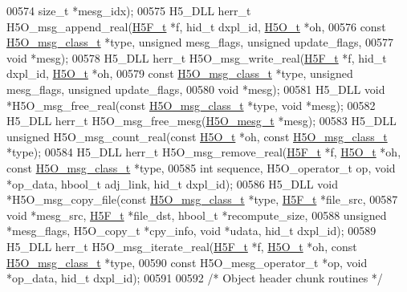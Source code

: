 \begin{DoxyCode}
00574     \textcolor{keywordtype}{size\_t} *mesg\_idx);
00575 H5\_DLL herr\_t H5O\_msg\_append\_real(\hyperlink{struct_h5_f__t}{H5F\_t} *f, hid\_t dxpl\_id, \hyperlink{struct_h5_o__t}{H5O\_t} *oh,
00576     \textcolor{keyword}{const} \hyperlink{struct_h5_o__msg__class__t}{H5O\_msg\_class\_t} *type, \textcolor{keywordtype}{unsigned} mesg\_flags, \textcolor{keywordtype}{unsigned} update\_flags,
00577     \textcolor{keywordtype}{void} *mesg);
00578 H5\_DLL herr\_t H5O\_msg\_write\_real(\hyperlink{struct_h5_f__t}{H5F\_t} *f, hid\_t dxpl\_id, \hyperlink{struct_h5_o__t}{H5O\_t} *oh,
00579     \textcolor{keyword}{const} \hyperlink{struct_h5_o__msg__class__t}{H5O\_msg\_class\_t} *type, \textcolor{keywordtype}{unsigned} mesg\_flags, \textcolor{keywordtype}{unsigned} update\_flags,
00580     \textcolor{keywordtype}{void} *mesg);
00581 H5\_DLL \textcolor{keywordtype}{void} *H5O\_msg\_free\_real(\textcolor{keyword}{const} \hyperlink{struct_h5_o__msg__class__t}{H5O\_msg\_class\_t} *type, \textcolor{keywordtype}{void} *mesg);
00582 H5\_DLL herr\_t H5O\_msg\_free\_mesg(\hyperlink{struct_h5_o__mesg__t}{H5O\_mesg\_t} *mesg);
00583 H5\_DLL \textcolor{keywordtype}{unsigned} H5O\_msg\_count\_real(\textcolor{keyword}{const} \hyperlink{struct_h5_o__t}{H5O\_t} *oh, \textcolor{keyword}{const} \hyperlink{struct_h5_o__msg__class__t}{H5O\_msg\_class\_t} *type);
00584 H5\_DLL herr\_t H5O\_msg\_remove\_real(\hyperlink{struct_h5_f__t}{H5F\_t} *f, \hyperlink{struct_h5_o__t}{H5O\_t} *oh, \textcolor{keyword}{const} 
      \hyperlink{struct_h5_o__msg__class__t}{H5O\_msg\_class\_t} *type,
00585     \textcolor{keywordtype}{int} sequence, H5O\_operator\_t op, \textcolor{keywordtype}{void} *op\_data, hbool\_t adj\_link, hid\_t dxpl\_id);
00586 H5\_DLL \textcolor{keywordtype}{void} *H5O\_msg\_copy\_file(\textcolor{keyword}{const} \hyperlink{struct_h5_o__msg__class__t}{H5O\_msg\_class\_t} *type, \hyperlink{struct_h5_f__t}{H5F\_t} *file\_src,
00587     \textcolor{keywordtype}{void} *mesg\_src, \hyperlink{struct_h5_f__t}{H5F\_t} *file\_dst, hbool\_t *recompute\_size,
00588     \textcolor{keywordtype}{unsigned} *mesg\_flags, H5O\_copy\_t *cpy\_info, \textcolor{keywordtype}{void} *udata, hid\_t dxpl\_id);
00589 H5\_DLL herr\_t H5O\_msg\_iterate\_real(\hyperlink{struct_h5_f__t}{H5F\_t} *f, \hyperlink{struct_h5_o__t}{H5O\_t} *oh, \textcolor{keyword}{const} 
      \hyperlink{struct_h5_o__msg__class__t}{H5O\_msg\_class\_t} *type,
00590     \textcolor{keyword}{const} H5O\_mesg\_operator\_t *op, \textcolor{keywordtype}{void} *op\_data, hid\_t dxpl\_id);
00591 
00592 \textcolor{comment}{/* Object header chunk routines */}

\end{DoxyCode}
